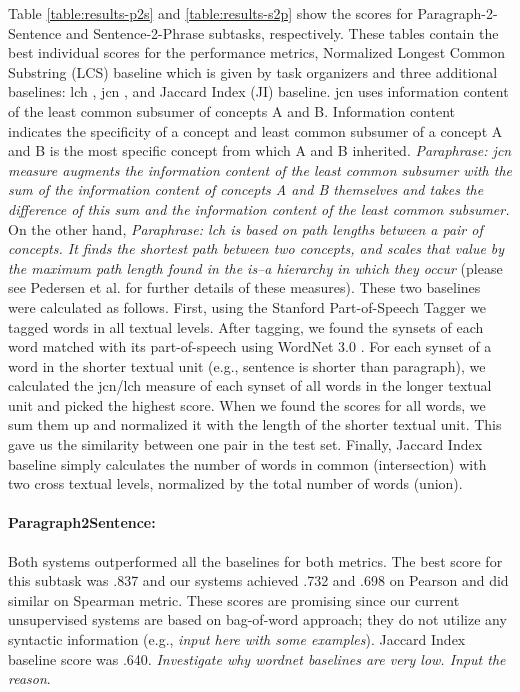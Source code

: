 \documentclass[11pt]{article}
\begin{document}
Table \ref{table:results-p2s} and \ref{table:results-s2p} show the scores for Paragraph-2-Sentence and Sentence-2-Phrase subtasks, respectively. These tables contain the best individual scores for the performance metrics, Normalized Longest Common Substring (LCS) baseline which is given by task organizers and three additional baselines: lch \cite{leacock1998combining}, jcn \cite{jiang1997semantic}, and Jaccard Index (JI) baseline. jcn uses information content \cite{resnik1995inforcontent} of the least common subsumer  of concepts A and B. Information content indicates the specificity of a concept and least common subsumer of a concept A and B is the most specific concept from which A and B inherited. \emph{Paraphrase: jcn measure augments the information content of the least common subsumer with the sum of the information content of concepts A and B themselves and takes the difference of this sum and the information content of the least common subsumer.} On the other hand, \emph{Paraphrase: lch is based on 
path lengths between a pair of concepts. It finds the shortest path between two concepts, and scales that value by the maximum path length found in the is–a hierarchy in which they occur} (please see Pedersen et al.  for further details of these measures). These two baselines were calculated as follows. First, using the Stanford Part-of-Speech Tagger \cite{toutanova2000enriching} we tagged words in all textual levels. After tagging, we found the synsets of each word matched with its part-of-speech using WordNet 3.0 \cite{fellbaum98electronic}. For each synset of a word in the shorter textual unit (e.g., sentence is shorter than paragraph), we calculated the jcn/lch measure of each synset of all words in the longer textual unit and picked the highest score. When we found the scores for all words, we sum them up and normalized it with the length of the shorter textual unit. This gave us the similarity between one pair in the test set. Finally, Jaccard Index baseline simply 
calculates the number of words in common (intersection) with two cross textual levels, normalized by the total number of words (union). 

\paragraph{Paragraph2Sentence:} Both systems outperformed all the baselines for both metrics. The best score for this subtask was .837 and our systems achieved .732 and .698 on Pearson and did similar on Spearman metric. These scores are promising since our current unsupervised systems are based on bag-of-word approach; they do not utilize any syntactic information (e.g., \emph{input here with some examples}). Jaccard Index baseline score was .640. \emph{Investigate why wordnet baselines are very low. Input the reason}.
\end{document}
